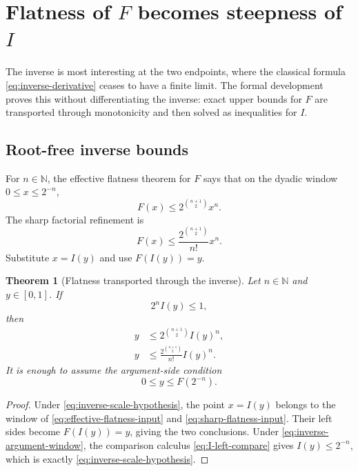 \documentclass[11pt,oneside]{article}
\newtheorem{theorem}{Theorem}[section]
\theoremstyle{definition}
\theoremstyle{remark}
\newcommand{\N}{\mathbb N}
\begin{document}
\section{Flatness of \texorpdfstring{$F$}{F} becomes steepness of \texorpdfstring{$I$}{I}}
\label{sec:inverse-steepness}

The inverse is most interesting at the two endpoints, where the classical formula
\eqref{eq:inverse-derivative} ceases to have a finite limit.  The formal development proves
this without differentiating the inverse: exact upper bounds for $F$ are transported through
monotonicity and then solved as inequalities for $I$.

\subsection{Root-free inverse bounds}

For $n\in\N$, the effective flatness theorem for $F$ says that on the dyadic window
$0\le x\le2^{-n}$,
\begin{equation}
 F(x)\le 2^{\binom{n+1}{2}}x^n.
 \label{eq:effective-flatness-input}
\end{equation}
The sharp factorial refinement is
\begin{equation}
 F(x)\le \frac{2^{\binom{n+1}{2}}}{n!}x^n.
 \label{eq:sharp-flatness-input}
\end{equation}
Substitute $x=I(y)$ and use $F(I(y))=y$.

\begin{theorem}[Flatness transported through the inverse]
\label{thm:inverse-root-free}
Let $n\in\N$ and $y\in[0,1]$.  If
\begin{equation}
 2^n I(y)\le1,
 \label{eq:inverse-scale-hypothesis}
\end{equation}
then
\begin{align}
 y&\le 2^{\binom{n+1}{2}}I(y)^n,                            \label{eq:inverse-basic-root-free}\\
 y&\le \frac{2^{\binom{n+1}{2}}}{n!}I(y)^n.                \label{eq:inverse-sharp-root-free}
\end{align}
It is enough to assume the argument-side condition
\begin{equation}
 0\le y\le F(2^{-n}).
 \label{eq:inverse-argument-window}
\end{equation}
\end{theorem}

\begin{proof}
Under \eqref{eq:inverse-scale-hypothesis}, the point $x=I(y)$ belongs to the window of
\eqref{eq:effective-flatness-input} and \eqref{eq:sharp-flatness-input}.  Their left sides
become $F(I(y))=y$, giving the two conclusions.  Under
\eqref{eq:inverse-argument-window}, the comparison calculus
\eqref{eq:I-left-compare} gives $I(y)\le2^{-n}$, which is exactly
\eqref{eq:inverse-scale-hypothesis}.
\end{proof}
\end{document}
